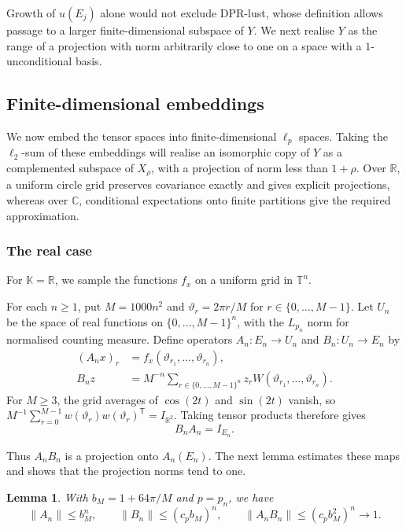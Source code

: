 \documentclass[11pt,a4paper,reqno]{amsart}
\newtheorem{lemma}[lemma]{Lemma}
\theoremstyle{definition}
\newcommand{\R}{\mathbb R}
\newcommand{\C}{\mathbb C}
\newcommand{\T}{\mathbb T}
\newcommand{\norm}[1]{\lVert #1\rVert}
\numberwithin{equation}{section}
\begin{document}
Growth of $u(E_j)$ alone would not exclude DPR-lust, whose definition allows passage to a larger finite-dimensional subspace of $Y$. We next realise $Y$ as the range of a projection with norm arbitrarily close to one on a space with a $1$-unconditional basis.
\subsection{Finite-dimensional embeddings}\label{sec:embedding}

We now embed the tensor spaces into finite-dimensional $\ell_p$ spaces. Taking the $\ell_2$-sum of these embeddings will realise an isomorphic copy of $Y$ as a complemented subspace of $X_\rho$, with a projection of norm less than $1+\rho$. Over $\R$, a uniform circle grid preserves covariance exactly and gives explicit projections, whereas over $\C$, conditional expectations onto finite partitions give the required approximation.

\subsubsection{The real case}
For $\mathbb K=\R$, we sample the functions $f_x$ on a uniform grid in $\T^n$.

For each $n\geq1$, put $M=1000n^2$ and $\vartheta_r=2\pi r/M$ for $r\in\{0,\ldots,M-1\}$. Let $U_n$ be the space of real functions on $\{0,\ldots,M-1\}^n$, with the $L_{p_n}$ norm for normalised counting measure. Define operators $A_n\colon E_n\to U_n$ and $B_n\colon U_n\to E_n$ by
\begin{equation}\label{eq:sampling-maps}
 \begin{split}
 (A_nx)_r&=f_x(\vartheta_{r_1},\ldots,\vartheta_{r_n}),\\
 B_nz&=M^{-n}\sum_{r\in\{0,\ldots,M-1\}^n}
             z_rW(\vartheta_{r_1},\ldots,\vartheta_{r_n}).
 \end{split}
\end{equation}
For $M\geq3$, the grid averages of $\cos(2t)$ and $\sin(2t)$ vanish, so $M^{-1}\sum_{r=0}^{M-1}w(\vartheta_r)w(\vartheta_r)^{\mathsf T}=I_{\R^2}$. Taking tensor products therefore gives
\begin{equation}\label{eq:exact-sampling}
 B_nA_n=I_{E_n}.
\end{equation}

Thus $A_nB_n$ is a projection onto $A_n(E_n)$. The next lemma estimates these maps and shows that the projection norms tend to one.

\begin{lemma}\label{lem:sampling}
With $b_M=1+64\pi/M$ and $p=p_n$, we have
\begin{equation}\label{eq:sampling-bounds}
 \norm{A_n}\leq b_M^n,\qquad
 \norm{B_n}\leq(c_pb_M)^n,\qquad
 \norm{A_nB_n}\leq(c_pb_M^2)^n\longrightarrow1.
\end{equation}
\end{lemma}
\end{document}

